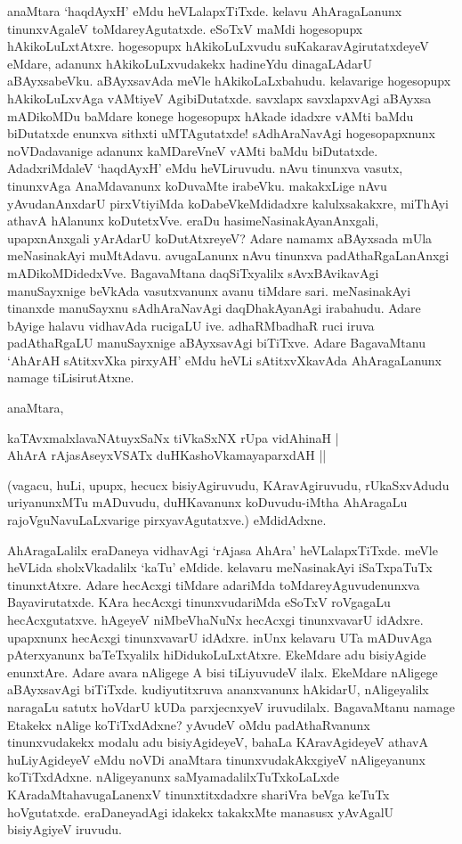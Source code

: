 anaMtara `haqdAyxH' eMdu heVLalapxTiTxde. kelavu AhAragaLanunx tinunxvAgaleV toMdareyAgutatxde. eSoTxV maMdi hogesopupx hAkikoLuLxtAtxre. hogesopupx hAkikoLuLxvudu suKakaravAgirutatxdeyeV eMdare, adanunx hAkikoLuLxvudakekx hadineYdu dinagaLAdarU aBAyxsabeVku. aBAyxsavAda meVle hAkikoLaLxbahudu. kelavarige hogesopupx hAkikoLuLxvAga vAMtiyeV AgibiDutatxde. savxlapx savxlapxvAgi aBAyxsa mADikoMDu baMdare konege hogesopupx hAkade idadxre vAMti baMdu biDutatxde enunxva sithxti uMTAgutatxde! sAdhAraNavAgi hogesopapxnunx noVDadavanige adanunx kaMDareVneV vAMti baMdu biDutatxde. AdadxriMdaleV `haqdAyxH' eMdu heVLiruvudu. nAvu tinunxva vasutx, tinunxvAga AnaMdavanunx koDuvaMte irabeVku. makakxLige nAvu yAvudanAnxdarU pirxVtiyiMda koDabeVkeMdidadxre kalulxsakakxre, miThAyi athavA hAlanunx koDutetxVve. eraDu hasimeNasinakAyanAnxgali, upapxnAnxgali yArAdarU koDutAtxreyeV? Adare namamx aBAyxsada mUla meNasinakAyi muMtAdavu. avugaLanunx nAvu tinunxva padAthaRgaLanAnxgi mADikoMDidedxVve. BagavaMtana daqSiTxyalilx sAvxBAvikavAgi manuSayxnige beVkAda vasutxvanunx avanu tiMdare sari. meNasinakAyi tinanxde manuSayxnu sAdhAraNavAgi daqDhakAyanAgi irabahudu. Adare bAyige halavu vidhavAda rucigaLU ive. adhaRMbadhaR ruci iruva padAthaRgaLU manuSayxnige aBAyxsavAgi biTiTxve. Adare BagavaMtanu `AhArAH sAtitxvXka pirxyAH' eMdu heVLi sAtitxvXkavAda AhAragaLanunx namage tiLisirutAtxne.

anaMtara,

\begin{shloka}
kaTAvxmalxlavaNAtuyxSaNx tiVkaSxNX rUpa vidAhinaH |\\
AhArA rAjasAseyxVSATx duHKashoVkamayaparxdAH ||
\end{shloka}

(vagacu, huLi, upupx, hecucx bisiyAgiruvudu, KAravAgiruvudu, rUkaSxvAdudu uriyanunxMTu mADuvudu, duHKavanunx koDuvudu-iMtha AhAragaLu rajoVguNavuLaLxvarige pirxyavAgutatxve.) eMdidAdxne.

AhAragaLalilx eraDaneya vidhavAgi `rAjasa AhAra' heVLalapxTiTxde. meVle heVLida sholxVkadalilx `kaTu' eMdide. kelavaru meNasinakAyi iSaTxpaTuTx tinunxtAtxre. Adare hecAcxgi tiMdare adariMda toMdareyAguvudenunxva Bayavirutatxde. KAra hecAcxgi tinunxvudariMda eSoTxV roVgagaLu hecAcxgutatxve. hAgeyeV niMbeVhaNuNx hecAcxgi tinunxvavarU idAdxre. upapxnunx hecAcxgi tinunxvavarU idAdxre. inUnx kelavaru UTa mADuvAga pAterxyanunx baTeTxyalilx hiDidukoLuLxtAtxre. EkeMdare adu bisiyAgide enunxtAre. Adare avara nAligege A bisi tiLiyuvudeV ilalx. EkeMdare nAligege aBAyxsavAgi biTiTxde. kudiyutitxruva ananxvanunx hAkidarU, nAligeyalilx naragaLu satutx hoVdarU kUDa parxjecnxyeV iruvudilalx. BagavaMtanu namage Etakekx nAlige koTiTxdAdxne? yAvudeV oMdu padAthaRvanunx tinunxvudakekx modalu adu bisiyAgideyeV, bahaLa KAravAgideyeV athavA huLiyAgideyeV eMdu noVDi anaMtara tinunxvudakAkxgiyeV nAligeyanunx koTiTxdAdxne. nAligeyanunx saMyamadalilxTuTxkoLaLxde KAradaMtahavugaLanenxV tinunxtitxdadxre shariVra beVga keTuTx hoVgutatxde. eraDaneyadAgi idakekx takakxMte manasusx yAvAgalU bisiyAgiyeV iruvudu.

